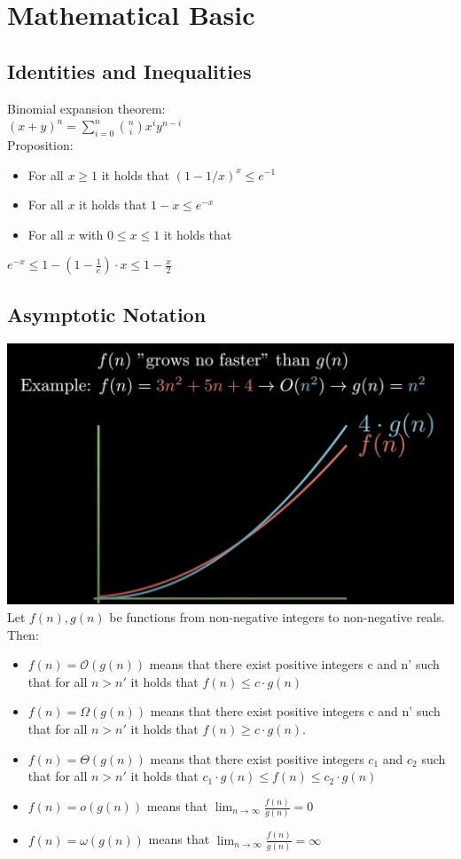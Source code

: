 \section{Mathematical Basic}
\subsection*{Identities and Inequalities}
Binomial expansion theorem:\\
$(x+y)^n=\sum_{i=0}^{n}\binom{n}{i}x^i y^{n-i}$\\
Proposition:\\
\begin{itemize}
    \item For all $x\ge 1$ it holds that $(1-1/x)^x\le e^{-1}$
    \item For all $x$ it holds that $1-x\le e^{-x}$
    \item For all $x$ with $0\le x \le 1$ it holds that
\end{itemize}
$e^{-x}\le 1-(1-\frac{1}{e})\cdot x\le 1-\frac{x}{2}$\\
\subsection*{Asymptotic Notation}
\includegraphics[width=\columnwidth]{big-o-explained.png}
Let $f(n),g(n)$ be functions from non-negative integers to non-negative reals. 
Then:
\begin{itemize}
    \item $f(n)=\mathcal{O}(g(n))$ means that there exist positive integers c 
    and n' such that for all $n > n'$ it holds that $f(n)\le c \cdot g(n)$
    \item $f(n)=\varOmega (g(n))$ means that there exist positive integers c
    and n' such that for all $n > n'$ it holds that $f(n)\ge c\cdot g(n)$.
    \item $f(n)=\varTheta (g(n))$ means that there exist positive integers 
    $c_{1}$ and $c_{2}$ such that for all $n > n'$ it holds that 
    $c_{1}\cdot g(n) \le f(n) \le c_{2} \cdot g(n)$
    \item $f(n)=o(g(n))$ means that $\lim_{n \to \infty} \frac{f(n)}{g(n)}=0$ 
    \item $f(n)=\omega (g(n))$ means that 
    $\lim_{n \to \infty} \frac{f(n)}{g(n)}=\infty$ 
\end{itemize}

